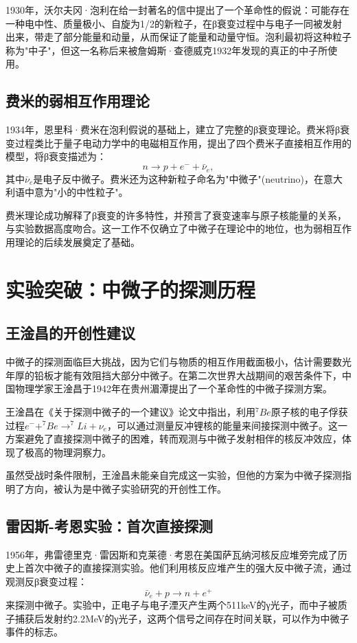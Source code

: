 \documentclass[12pt, a4paper]{article}
\begin{document}
1930年，沃尔夫冈·泡利在给一封著名的信中提出了一个革命性的假说：可能存在一种电中性、质量极小、自旋为1/2的新粒子，在β衰变过程中与电子一同被发射出来，带走了部分能量和动量，从而保证了能量和动量守恒。泡利最初将这种粒子称为"中子"，但这一名称后来被詹姆斯·查德威克1932年发现的真正的中子所使用。

\subsection{费米的弱相互作用理论}
1934年，恩里科·费米在泡利假说的基础上，建立了完整的β衰变理论。费米将β衰变过程类比于量子电动力学中的电磁相互作用，提出了四个费米子直接相互作用的模型，将β衰变描述为：
$$n \to p + e^{-} + \bar{\nu}_{e},$$
其中$\bar{\nu}_{e}$是电子反中微子。费米还为这种新粒子命名为"中微子"(neutrino)，在意大利语中意为"小的中性粒子"。

费米理论成功解释了β衰变的许多特性，并预言了衰变速率与原子核能量的关系，与实验数据高度吻合。这一工作不仅确立了中微子在理论中的地位，也为弱相互作用理论的后续发展奠定了基础。

\section{实验突破：中微子的探测历程}
\subsection{王淦昌的开创性建议}
中微子的探测面临巨大挑战，因为它们与物质的相互作用截面极小，估计需要数光年厚的铅板才能有效阻挡大部分中微子。在第二次世界大战期间的艰苦条件下，中国物理学家王淦昌于1942年在贵州湄潭提出了一个革命性的中微子探测方案。

王淦昌在《关于探测中微子的一个建议》论文中指出，利用$^7Be$原子核的电子俘获过程$e^- + ^7Be \to ^7Li + \nu_e$，可以通过测量反冲锂核的能量来间接探测中微子。这一方案避免了直接探测中微子的困难，转而观测与中微子发射相伴的核反冲效应，体现了极高的物理洞察力。

虽然受战时条件限制，王淦昌未能亲自完成这一实验，但他的方案为中微子探测指明了方向，被认为是中微子实验研究的开创性工作。

\subsection{雷因斯-考恩实验：首次直接探测}
1956年，弗雷德里克·雷因斯和克莱德·考恩在美国萨瓦纳河核反应堆旁完成了历史上首次中微子的直接探测实验。他们利用核反应堆产生的强大反中微子流，通过观测反β衰变过程：
$$\bar{\nu}_e + p \to n + e^+$$
来探测中微子。实验中，正电子与电子湮灭产生两个511keV的γ光子，而中子被质子捕获后发射约2.2MeV的γ光子，这两个信号之间存在时间关联，可以作为中微子事件的标志。
\end{document}

